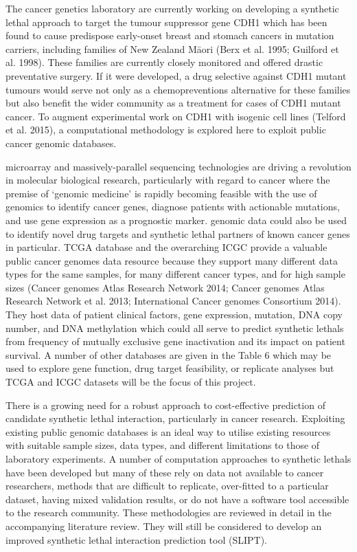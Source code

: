 The cancer genetics laboratory are currently working on developing a \gls{synthetic lethal} approach to target the \gls{tumour suppressor} gene CDH1 which has been found to cause predispose early-onset breast and stomach cancers in \gls{mutation} carriers, including families of New Zealand M\={a}ori (Berx et al. 1995; Guilford et al. 1998).  These families are currently closely monitored and offered drastic preventative surgery.  If it were developed, a drug selective against CDH1 \gls{mutant} \glspl{tumour} would serve not only as a \glspl{chemoprevention} alternative for these families but also benefit the wider community as a treatment for  cases of CDH1 \gls{mutant} cancer.  To augment experimental work on CDH1 with isogenic cell lines (Telford et al. 2015), a computational methodology is explored here to exploit public cancer \gls{genomic} databases.

\Gls{microarray} and massively-parallel sequencing technologies are driving a revolution in molecular biological research, particularly with regard to cancer where the premise of ‘genomic medicine’ is rapidly becoming feasible with the use of \glspl{genomic} to identify cancer genes, diagnose patients with actionable \glspl{mutation}, and use \gls{gene expression} as a prognostic marker.  \Gls{genomic} data could also be used to identify novel drug targets and \gls{synthetic lethal} partners of known cancer genes in particular.  \acrlong{TCGA} database and the overarching \gls{ICGC} provide a valuable public cancer \glspl{genome} data resource because they support many different data types for the same samples, for many different cancer types, and for high sample sizes (Cancer \Glspl{genome} Atlas Research Network 2014; Cancer \Glspl{genome} Atlas Research Network et al. 2013; International Cancer \Glspl{genome} Consortium 2014).  They host data of patient clinical factors, \gls{gene expression},  \gls{mutation}, \acrshort{DNA} copy number, and \acrshort{DNA} methylation which could all serve to predict \glspl{synthetic lethal} from frequency of mutually exclusive gene inactivation and its impact on patient survival.  A number of other databases are given in the Table 6 which may be used to explore gene function, drug target feasibility, or replicate analyses but \gls{TCGA} and \gls{ICGC} datasets will be the focus of this project.

There is a growing need for a robust approach to cost-effective prediction of candidate \gls{synthetic lethal} interaction, particularly in cancer research.  Exploiting existing public \gls{genomic} databases is an ideal way to utilise existing resources with suitable sample sizes, data types, and different limitations to those of laboratory experiments.  A number of computation approaches to \glspl{synthetic lethal} have been developed but many of these rely on data not available to cancer researchers, methods that are difficult to replicate, over-fitted to a particular dataset, having mixed validation results, or do not have a software tool accessible to the research community.  These methodologies are reviewed in detail in the accompanying literature review.  They will still be considered to develop an improved \gls{synthetic lethal} interaction prediction tool (SLIPT).  


